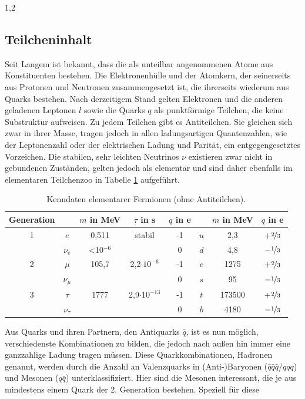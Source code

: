 \documentclass[11pt,a4paper,twoside]{report}
\begin{document}
\begin{spacing}{1,2}
\subsection{Teilcheninhalt}
Seit Langem ist bekannt, dass die als unteilbar angenommenen Atome aus Konstituenten bestehen. Die Elektronenhülle und der Atomkern, der seinerseits aus
Protonen und Neutronen zusammengesetzt ist, die ihrerseits wiederum aus Quarks bestehen. Nach derzeitigem Stand gelten Elektronen und die anderen geladenen 
Leptonen $l$ sowie die Quarks $q$ als punktförmige
Teilchen, die keine Substruktur aufweisen. Zu jedem Teilchen gibt es Antiteilchen. Sie gleichen sich zwar in ihrer Masse, tragen jedoch in allen ladungsartigen Quantenzahlen, wie der Leptonenzahl oder
der elektrischen Ladung und Parität, ein entgegengesetztes Vorzeichen. Die stabilen, sehr leichten Neutrinos $\nu$ existieren zwar nicht in gebundenen Zuständen, gelten jedoch als elementar und sind daher 
ebenfalls im elementaren Teilchenzoo \cite{PDG} in Tabelle \ref{tab_particlezoo} aufgeführt.
\begin{table}[H]
\begin{tabular}{c|cccc|ccc} \toprule 
 Generation & & $m$ in MeV & $\tau$ in s & $q$ in e & & $m$ in MeV & $q$ in e\\
 \midrule
  1 & $e$ & 0,511 & stabil & -1 & $u$ & 2,3 & +$\nicefrac23$\\
  &$\nu_\text{e}$& <10$^{-6}$ &  & 0 & $d$ & 4,8 & $-\nicefrac13$\\
  2 & $\mu$ & 105,7 & 2,2$\cdot 10^{-6}$ & -1 & $c$ &1275& +$\nicefrac23$\\
  &$\nu_\mu$ & & & 0 & $s$ &95& $-\nicefrac13$\\
  3& $\tau$ &1777& 2,9$\cdot 10^{-13}$ & -1 & $t$ & 173500 & +$\nicefrac23$\\
  &$\nu_\tau$& & & 0 & $b$ &4180 & $-\nicefrac13$
\\\bottomrule \bottomrule
 \end{tabular}
\caption{Kenndaten elementarer Fermionen (ohne Antiteilchen).}
\label{tab_particlezoo}
\end{table}
\noindent
Aus Quarks und ihren Partnern, den Antiquarks $\bar q$, ist es nun möglich, verschiedenste Kombinationen zu bilden, die jedoch nach außen hin immer eine
ganzzahlige Ladung tragen müssen. Diese Quarkkombinationen, Hadronen genannt, werden durch die Anzahl an Valenzquarks in (Anti-)Baryonen ($\bar q\bar q\bar q$/$qqq$) und 
Mesonen ($q\bar q$) unterklassifiziert. Hier sind die Mesonen interessant, die je aus mindestens einem Quark der 2. Generation bestehen. Speziell für diese

\end{spacing}
\end{document}
